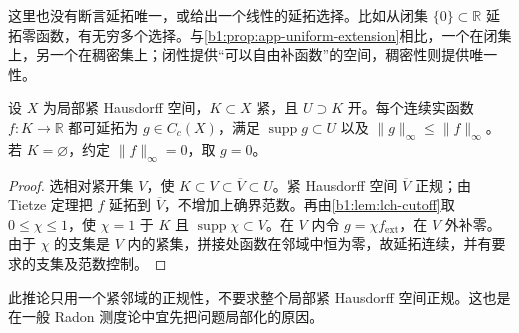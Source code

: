 \ProseParagraphBreak

这里也没有断言延拓唯一，或给出一个线性的延拓选择。比如从闭集 \(\{0\}\subset\mathbb R\) 延拓零函数，有无穷多个选择。与\cref{b1:prop:app-uniform-extension}相比，一个在闭集上，另一个在稠密集上；闭性提供“可以自由补函数”的空间，稠密性则提供唯一性。

\begin{corollary}\label{b1:cor:app-compact-extension}
设 \(X\) 为局部紧 Hausdorff 空间，\(K\subset X\) 紧，且 \(U\supset K\) 开。每个连续实函数 \(f:K\rightarrow\mathbb R\) 都可延拓为 \(g\in C_c(X)\)，满足 \(\operatorname{supp}g\subset U\) 以及 \(\|g\|_\infty\le\|f\|_\infty\)。若 \(K=\varnothing\)，约定 \(\|f\|_\infty=0\)，取 \(g=0\)。
\end{corollary}
\begin{proof}
选相对紧开集 \(V\)，使 \(K\subset V\subset\overline V\subset U\)。紧 Hausdorff 空间 \(\overline V\) 正规；由 Tietze 定理把 \(f\) 延拓到 \(\overline V\)，不增加上确界范数。再由\cref{b1:lem:lch-cutoff}取 \(0\le\chi\le1\)，使 \(\chi=1\) 于 \(K\) 且 \(\operatorname{supp}\chi\subset V\)。在 \(V\) 内令 \(g=\chi f_{\mathrm{ext}}\)，在 \(V\) 外补零。由于 \(\chi\) 的支集是 \(V\) 内的紧集，拼接处函数在邻域中恒为零，故延拓连续，并有要求的支集及范数控制。
\end{proof}

此推论只用一个紧邻域的正规性，不要求整个局部紧 Hausdorff 空间正规。这也是在一般 Radon 测度论中宜先把问题局部化的原因。
